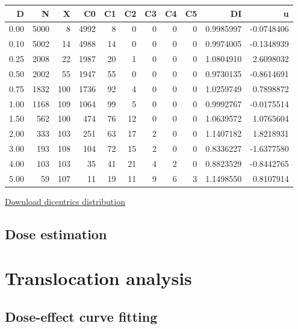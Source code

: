 \documentclass[]{scrartcl}
\begin{document}
\begin{tabular}{r|r|r|r|r|r|r|r|r|r|r}
\hline
D & N & X & C0 & C1 & C2 & C3 & C4 & C5 & DI & u\\
\hline
0.00 & 5000 & 8 & 4992 & 8 & 0 & 0 & 0 & 0 & 0.9985997 & -0.0748406\\
\hline
0.10 & 5002 & 14 & 4988 & 14 & 0 & 0 & 0 & 0 & 0.9974005 & -0.1348939\\
\hline
0.25 & 2008 & 22 & 1987 & 20 & 1 & 0 & 0 & 0 & 1.0804910 & 2.6098032\\
\hline
0.50 & 2002 & 55 & 1947 & 55 & 0 & 0 & 0 & 0 & 0.9730135 & -0.8614691\\
\hline
0.75 & 1832 & 100 & 1736 & 92 & 4 & 0 & 0 & 0 & 1.0259749 & 0.7898872\\
\hline
1.00 & 1168 & 109 & 1064 & 99 & 5 & 0 & 0 & 0 & 0.9992767 & -0.0175514\\
\hline
1.50 & 562 & 100 & 474 & 76 & 12 & 0 & 0 & 0 & 1.0639572 & 1.0765604\\
\hline
2.00 & 333 & 103 & 251 & 63 & 17 & 2 & 0 & 0 & 1.1407182 & 1.8218931\\
\hline
3.00 & 193 & 108 & 104 & 72 & 15 & 2 & 0 & 0 & 0.8336227 & -1.6377580\\
\hline
4.00 & 103 & 103 & 35 & 41 & 21 & 4 & 2 & 0 & 0.8823529 & -0.8442765\\
\hline
5.00 & 59 & 107 & 11 & 19 & 11 & 9 & 6 & 3 & 1.1498550 & 0.8107914\\
\hline
\end{tabular}

\href{https://biodosimetry-uab.github.io/documentation/data/count-data-IAEA.csv}{Download dicentrics distribution}

\hypertarget{dose-estimation}{%
\subsection{Dose estimation}\label{dose-estimation}}

\hypertarget{stats-trans}{%
\section{Translocation analysis}\label{stats-trans}}

\hypertarget{dose-effect-curve-fitting-1}{%
\subsection{Dose-effect curve fitting}\label{dose-effect-curve-fitting-1}}
\end{document}
